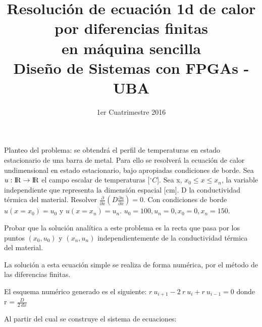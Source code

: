 \documentclass[a4paper,10pt]{article}
\title{Resolución de ecuación 1d de calor por diferencias finitas \\ en máquina sencilla
\\
Diseño de Sistemas con FPGAs - UBA}
\date{1er Cuatrimestre 2016 }
\begin{document}
\lstset{tabsize=2, language=C}

\maketitle


Planteo del problema: se obtendrá el perfil de temperaturas en estado estacionario de una barra de metal. Para ello se resolverá la ecuación de calor undimensional en estado estacionario, bajo apropiadas condiciones de borde.
Sea $u: \rm I\!R \to \rm I\!R $ el campo escalar de temperaturas [$^{\circ}C$].  Sea x, $x_0 \leq x \leq x_n$,  la variable independiente que representa la dimensión espacial [cm]. D la conductividad térmica del material. Resolver $\frac{\partial }{\partial x} \left( D \frac{\partial u}{\partial x} \right) = 0$. Con condiciones de borde $u(x=x_0)=u_0$ y $u(x=x_n)=u_n$. $u_0=100, u_n=0, x_0=0, x_n=150$.


Probar que la solución analítica a este problema es la recta que pasa por los puntos $(x_0,u_0)$ y $(x_n,u_n)$ independientemente de la conductividad térmica del material.

La solución a esta ecuación simple se realiza de forma numérica, por el método de las diferencias finitas.

El esquema numérico generado es el siguiente: $r \ u_{i+1} - 2 \ r \ u_i + r \ u_{i-1} = 0$ donde r = $\frac{D}{2 \ dx}$

Al partir del cual se construye el sistema de ecuaciones:
\end{document}
